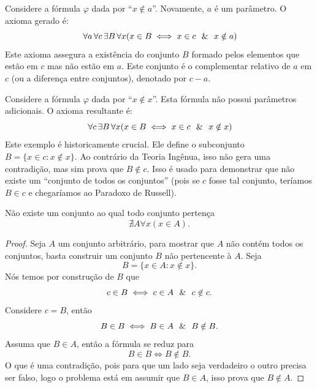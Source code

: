 

\begin{exemplo}
    Considere a fórmula \(\varphi\) dada por ``\(x \notin a\)''. Novamente, \(a\) é um parâmetro. O axioma gerado é:
    \[
        \forall a \forall c \exists B \forall x (x \in B \iff x \in c \e x \notin a)
    \]
    Este axioma assegura a existência do conjunto \(B\) formado pelos elementos que estão em \(c\) mas não estão em \(a\). Este conjunto é o complementar relativo de \(a\) em \(c\) (ou a diferença entre conjuntos), denotado por \(c - a\).
\end{exemplo}

\begin{exemplo}
    Considere a fórmula \(\varphi\) dada por ``\(x \notin x\)''. Esta fórmula não possui parâmetros adicionais. O axioma resultante é:
    \[
        \forall c \exists B \forall x (x \in B \iff x \in c \e x \notin x)
    \]
    Este exemplo é historicamente crucial. Ele define o subconjunto \(B = \{x \in c : x \notin x\}\). Ao contrário da Teoria Ingênua, isso não gera uma contradição, mas sim prova que \(B \notin c\). Isso é usado para demonstrar que não existe um ``conjunto de todos os conjuntos''  (pois se \(c\) fosse tal conjunto, teríamos \(B \in c\) e chegaríamos ao Paradoxo de Russell).
\end{exemplo}

\begin{teorema}
    \label{teo:conjunto_universo}
    Não existe um conjunto ao qual todo conjunto pertença
    \[
        \nexists A \forall x (x \in A).
    \]
\end{teorema}

\begin{proof}
    Seja \(A\) um conjunto arbitrário, para mostrar que \(A\) não contém todos os conjuntos, basta construir um conjunto \(B\) não pertencente à \(A\). Seja
    \[
        B = \{x \in A: x \notin x\}.
    \]
    Nós temos por construção de \(B\) que
    \[
        c \in B \iff c \in A \ \ \& \ \  c \notin c.
    \]
    Considere \(c = B\), então
    \[
        B \in B \iff B \in A \ \ \& \ \  B \notin B.
    \]
    Assuma que \(B \in A\), então a fórmula se reduz para
    \[
        B \in B \iff B \notin B.
    \]
    O que é uma contradição, pois para que um lado seja verdadeiro o outro precisa ser falso, logo o problema está em assumir que \(B \in A\), isso prova que \(B \notin A\).
\end{proof}

